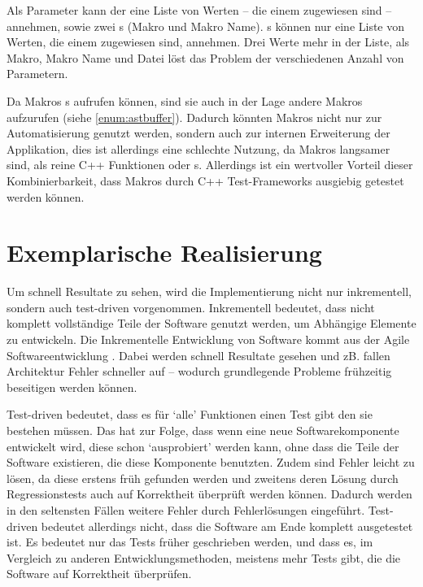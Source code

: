       Als Parameter kann der  eine Liste von  Werten -- die einem  zugewiesen sind -- annehmen, sowie zwei s (Makro und Makro Name). s können nur eine Liste von  Werten, die einem  zugewiesen sind, annehmen. Drei  Werte mehr in der Liste, als Makro, Makro Name und Datei löst das Problem der verschiedenen Anzahl von Parametern.

      Da Makros s aufrufen können, sind sie auch in der Lage andere Makros aufzurufen (siehe \ref{enum:astbuffer}). Dadurch könnten Makros nicht nur zur Automatisierung genutzt werden, sondern auch zur internen Erweiterung der Applikation, dies ist allerdings eine schlechte Nutzung, da Makros langsamer sind, als reine C++ Funktionen oder s. Allerdings ist ein wertvoller Vorteil dieser Kombinierbarkeit, dass Makros durch C++ Test-Frameworks ausgiebig getestet werden können.

\section{Exemplarische Realisierung}
\label{sec:Exemplarische Realisierung}
  Um schnell Resultate zu sehen, wird die Implementierung nicht nur inkrementell, sondern auch test-driven \autocite{beck2003test} vorgenommen. Inkrementell bedeutet, dass nicht komplett vollständige Teile der Software genutzt werden, um Abhängige Elemente zu entwickeln. Die Inkrementelle Entwicklung von Software kommt aus der Agile Softwareentwicklung \autocite{cohen2003agile}. Dabei werden schnell Resultate gesehen und zB. fallen Architektur Fehler schneller auf -- wodurch grundlegende Probleme frühzeitig beseitigen werden können.

  Test-driven bedeutet, dass es für `alle' Funktionen einen Test gibt den sie bestehen müssen. Das hat zur Folge, dass wenn eine neue Softwarekomponente entwickelt wird, diese schon `ausprobiert' werden kann, ohne dass die Teile der Software existieren, die diese Komponente benutzten. Zudem sind Fehler leicht zu lösen, da diese erstens früh gefunden werden und zweitens deren Lösung durch Regressionstests auch auf Korrektheit überprüft werden können. Dadurch werden in den seltensten Fällen weitere Fehler durch Fehlerlösungen eingeführt. Test-driven bedeutet allerdings nicht, dass die Software am Ende komplett ausgetestet ist. Es bedeutet nur das Tests früher geschrieben werden, und dass es, im Vergleich zu anderen Entwicklungsmethoden, meistens mehr Tests gibt, die die Software auf Korrektheit überprüfen.


